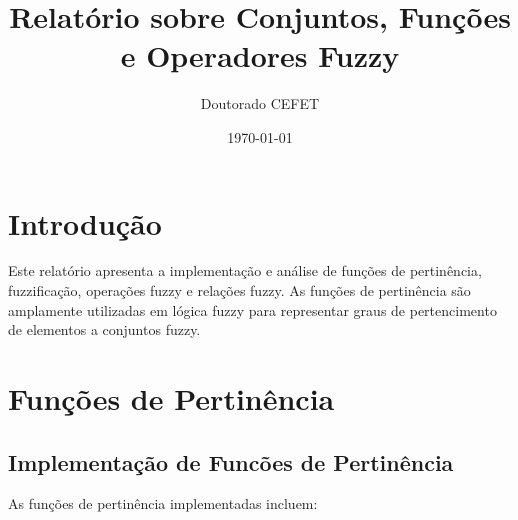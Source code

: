 \documentclass[a4paper,12pt]{article}
\title{Relatório sobre Conjuntos, Funções e Operadores Fuzzy}
\author{Doutorado CEFET}
\date{\today}
\begin{document}
\maketitle

\section{Introdução}
Este relatório apresenta a implementação e análise de funções de pertinência, fuzzificação, operações fuzzy e relações fuzzy. As funções de pertinência são amplamente utilizadas em lógica fuzzy para representar graus de pertencimento de elementos a conjuntos fuzzy.

\section{Funções de Pertinência}
\subsection{Implementação de Funcões de Pertinência}
As funções de pertinência implementadas incluem:
\end{document}
